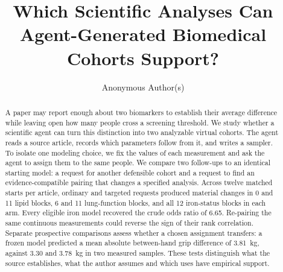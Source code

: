 \documentclass[sigconf,anonymous,review]{acmart}
\begin{document}
\title[Which Analyses Can Agent-Generated Cohorts Support?]{Which Scientific Analyses Can Agent-Gener\-ated Biomedical Cohorts Support?}
\author{Anonymous Author(s)}

\begin{abstract}
A paper may report enough about two biomarkers to establish their average difference while leaving open how many people cross a screening threshold. We study whether a scientific agent can turn this distinction into two analyzable virtual cohorts. The agent reads a source article, records which parameters follow from it, and writes a sampler. To isolate one modeling choice, we fix the values of each measurement and ask the agent to assign them to the same people. We compare two follow-ups to an identical starting model: a request for another defensible cohort and a request to find an evidence-compatible pairing that changes a specified analysis. Across twelve matched starts per article, ordinary and targeted requests produced material changes in 0 and 11 lipid blocks, 6 and 11 lung-function blocks, and all 12 iron-status blocks in each arm. Every eligible iron model recovered the crude odds ratio of 6.65. Re-pairing the same continuous measurements could reverse the sign of their rank correlation. Separate prospective comparisons assess whether a chosen assignment transfers: a frozen model predicted a mean absolute between-hand grip difference of 3.81~kg, against 3.30 and 3.78~kg in two measured samples. These tests distinguish what the source establishes, what the author assumes and which uses have empirical support.

\end{abstract}

\maketitle
\end{document}
